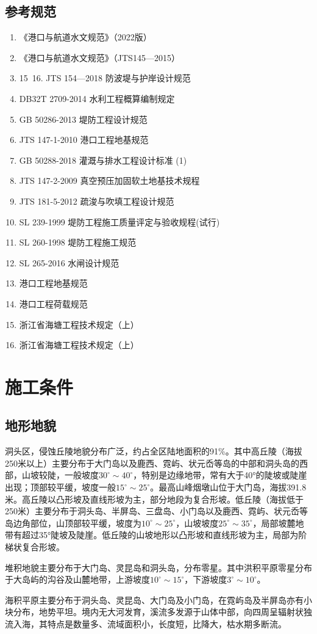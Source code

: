 \documentclass[UTF8, a4paper, 12pt]{ctexart} %
\begin{document}
\subsection{参考规范}
\begin{enumerate}
    
    \item 《港口与航道水文规范》（2022版）
    \item 《港口与航道水文规范》（JTS145—2015）
    \item  15~16. JTS 154—2018 防波堤与护岸设计规范
    \item  DB32T 2709-2014 水利工程概算编制规定
    \item  GB 50286-2013  堤防工程设计规范
    \item JTS 147-1-2010 港口工程地基规范
    \item GB 50288-2018 灌溉与排水工程设计标准 (1)
    \item JTS 147-2-2009 真空预压加固软土地基技术规程
    \item JTS 181-5-2012 疏浚与吹填工程设计规范
    \item SL 239-1999 堤防工程施工质量评定与验收规程(试行)
    \item SL 260-1998 堤防工程施工规范
    \item SL 265-2016 水闸设计规范
    \item 港口工程地基规范
    \item 港口工程荷载规范
    \item 浙江省海塘工程技术规定（上）
    \item 浙江省海塘工程技术规定（上）
    
    \end{enumerate}
\section{施工条件}
\subsection{地形地貌}
洞头区，侵蚀丘陵地貌分布广泛，约占全区陆地面积的91\%。其中高丘陵（海拔250米以上）主要分布于大门岛以及鹿西、霓屿、状元岙等岛的中部和洞头岛的西部，山坡较陡，一般坡度$30^{\circ}\sim40^{\circ}$，特别是边缘地带，常有大于40°的陡坡或陡崖出现；顶部较平缓，坡度一般$15^{\circ}\sim25^{\circ}$。最高山峰烟墩山位于大门岛，海拔391.8米。高丘陵以凸形坡及直线形坡为主，部分地段为复合形坡。低丘陵（海拔低于250米）主要分布于洞头岛、半屏岛、三盘岛、小门岛以及鹿西、霓屿、状元岙等岛边角部位，山顶部较平缓，坡度为$10^{\circ}\sim25^{\circ}$，山坡坡度$25^{\circ}\sim35^{\circ}$，局部坡麓地带有超过35°陡坡及陡崖。低丘陵的山坡地形以凸形坡和直线形坡为主，局部为阶梯状复合形坡。
\par 堆积地貌主要分布于大门岛、灵昆岛和洞头岛，分布零星。其中洪积平原零星分布于大岛屿的沟谷及山麓地带，上游坡度$10^{\circ}\sim15^{\circ}$，下游坡度$3^{\circ}\sim10^{\circ}$。
\par 海积平原主要分布于洞头岛、灵昆岛、大门岛及小门岛，在霓屿岛及半屏岛亦有小块分布，地势平坦。境内无大河发育，溪流多发源于山体中部，向四周呈辐射状独流入海，其特点是数量多、流域面积小，长度短，比降大，枯水期多断流。
\end{document}
